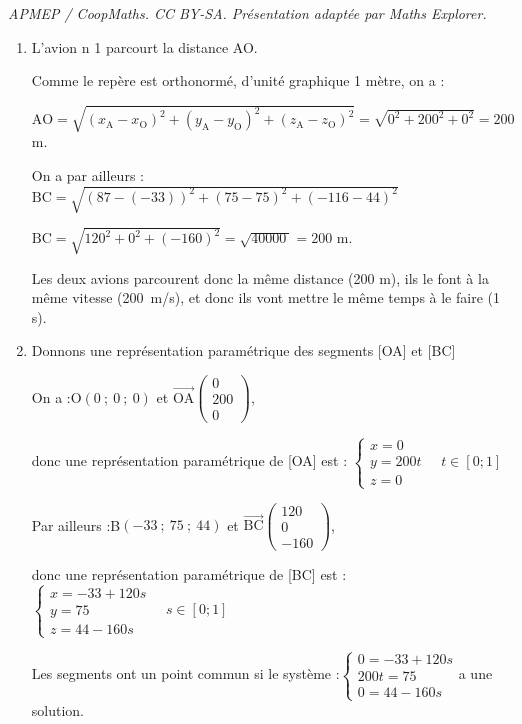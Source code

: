 \documentclass[10pt]{article}
\providecommand{\vect}[1]{\overrightarrow{#1}}
\providecommand{\np}[2][]{{#2~#1}}
\begin{document}
\noindent\textit{APMEP / CoopMaths. CC BY-SA. Présentation adaptée par Maths Explorer.}\par\medskip
\begin{enumerate}
\item L'avion n 1 parcourt la distance AO.

Comme le repère est orthonormé, d'unité graphique 1 mètre, on a :

$\mathrm{AO} = \sqrt{(x_\mathrm{A} - x_{\mathrm{O}})^2+(y_\mathrm{A} - y_{\mathrm{O}})^2+(z_\mathrm{A} - z_{\mathrm{O}})^2} = \sqrt{0^2 +200^2 + 0^2 } = 200$ m.

On a par ailleurs : \quad $\mathrm{BC} = \sqrt{(87 - (-33))^2 + (75 - 75)^2 + (-116 - 44)^2}$

$\mathrm{BC}  = \sqrt{120^2 + 0^2 + (-160)^2}= \sqrt{\np{40000}} = 200$ m.

Les deux avions parcourent donc la même distance (200 m), ils le font à la même vitesse (\np[m/s]{200}), et donc ils vont mettre le même temps à le faire (1 s).

\item Donnons une représentation paramétrique des segments [OA] et [BC]

On a :\quad O$(0~;~0~;~0)$ et $\vect{\mathrm{OA}} \begin{pmatrix} 0\\200\\0\end{pmatrix}$,

donc une représentation paramétrique de [OA] est  :
\quad
$\begin{cases} x = 0\\y = 200t \\z = 0\end{cases} \quad t \in [0 ; 1]$

Par ailleurs :\quad B$(-33~;~75~;~44)$ et $\vect{\mathrm{BC}} \begin{pmatrix} 120\\0\\-160\end{pmatrix}$,

donc une représentation paramétrique de [BC] est  :
\quad
$\begin{cases} x = -33 + 120s\\y = 75 \\z = 44 -160s\end{cases} \quad s \in [0 ; 1]$

Les segments ont un point commun si le système :\quad $\begin{cases}
0 = -33 + 120s\\200t = 75\\0 = 44 - 160s\end{cases}$\quad a une solution.


\end{enumerate}
\end{document}
